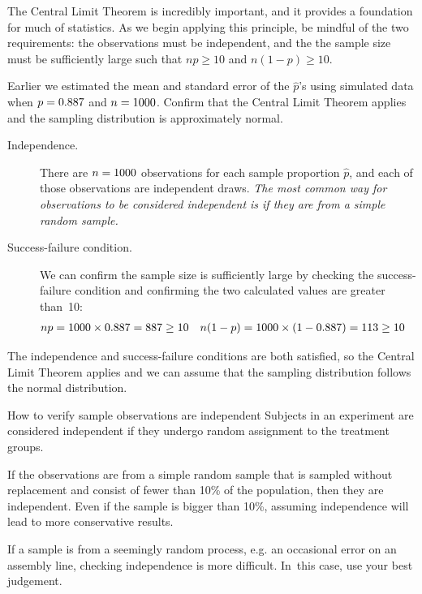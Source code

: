The Central Limit Theorem is incredibly important, and it provides
a foundation for much of statistics. As we begin applying
this principle, be mindful of the two requirements:
the observations must be independent, and the the sample size must
be sufficiently large such that $np \geq 10$ and $n(1-p) \geq 10$.

\begin{examplewrap}
\begin{nexample}{Earlier we estimated the mean and standard
error of the $\hat{p}$'s using simulated data when
$p = 0.887{}$ and $n = 1000{}$.
Confirm that the Central Limit Theorem applies and the sampling 
distribution is approximately normal.}\label{sample_p887_n1000_confirm_normal}
\begin{description}
\item[Independence.] There are $n = 1000{}$
    observations for each
    sample proportion $\hat{p}$, and each of those observations
    are independent draws. \emph{The most common way for
    observations to be considered independent is if they are from
    a simple random sample.}
\item[Success-failure condition.] We can confirm the sample size
    is sufficiently large by checking the success-failure condition
    and confirming the two calculated values are greater than~10:
    \begin{align*}
    np &= 1000{} \times 0.887{}
        = 887{}
        \geq 10
    &n(1-p) &= 1000{} \times (1 - 0.887{})
        = 113{}
        \geq 10
    \end{align*}
\end{description}
The independence and success-failure conditions are both 
satisfied, so the Central Limit Theorem applies and we can assume 
that the sampling distribution follows the normal distribution.
\end{nexample}
\end{examplewrap}

\begin{onebox}{How to verify sample observations are independent}
  Subjects in an experiment are considered independent
  if they undergo random assignment to the treatment
  groups.\vspace{3mm}

  If the observations are from a simple random sample that is sampled 
  without replacement and consist of fewer than 10\% of the population, 
  then they are independent.
  Even if the sample is bigger than 10\%, assuming independence
  will lead to more conservative results.\vspace{3mm}

  If a sample is from a seemingly random process,
  e.g. an occasional error on an assembly line,
  checking independence is more difficult. In~this case,
  use your best judgement.
\end{onebox}

